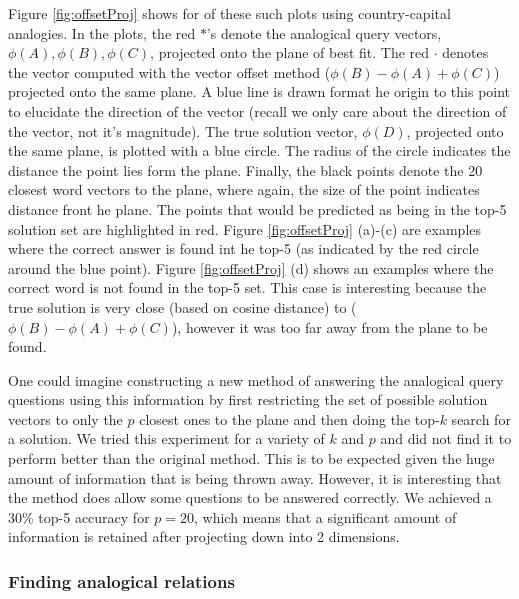 Figure \ref{fig:offsetProj} shows for of these such plots using country-capital analogies. In the plots, the red $*$'s denote the analogical query vectors, $\phi(A), \phi(B), \phi(C)$, projected onto the plane of best fit. The red $\cdot$ denotes the vector computed with the vector offset method ($\phi(B) - \phi(A) + \phi(C)$) projected onto the same plane. A blue line is drawn format he origin to this point to elucidate the direction of the vector (recall we only care about the direction of the vector, not it's magnitude). The true solution vector, $\phi(D)$, projected onto the same plane, is plotted with a blue circle. The radius of the circle indicates the distance the point lies form the plane. Finally, the black points denote the 20 closest word vectors to the plane, where again, the size of the point indicates distance front he plane. The points that would be predicted as being in the top-5 solution set are highlighted in red. Figure \ref{fig:offsetProj} (a)-(c) are examples where the correct answer is found int he top-5 (as indicated by the red circle around the blue point). Figure \ref{fig:offsetProj} (d) shows an examples where the correct word is not found in the top-5 set. This case is interesting because the true solution is very close (based on cosine distance) to ($\phi(B) - \phi(A) + \phi(C)$), however it was too far away from the plane to be found. 

One could imagine constructing a new method of answering the analogical query questions using this information by first restricting the set of possible solution vectors to only the $p$ closest ones to the plane and then doing the top-$k$ search for a solution. We tried this experiment for a variety of $k$ and $p$ and did not find it to perform better than the original method. This is to be expected given the huge amount of information that is being thrown away. However, it is interesting that the method does allow some questions to be answered correctly. We achieved a 30\% top-5 accuracy for $p = 20$, which means that a significant amount of information is retained after projecting down into 2 dimensions.  



\subsubsection{Finding analogical relations}
